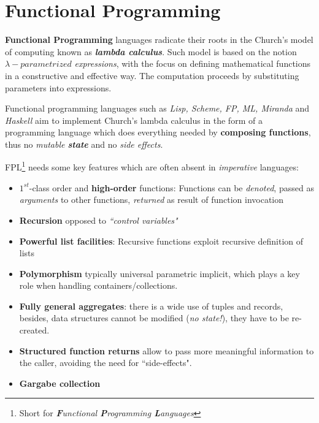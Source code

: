 \chapter{Functional Programming}
\textbf{Functional Programming} languages radicate their roots in the Church's model of computing known as \textbf{\textit{lambda calculus}}.
Such model is based on the notion $\lambda-\textit{parametrized}$ \textit{expressions},
with the focus on defining mathematical functions in a constructive and effective way.
The computation proceeds by substituting parameters into expressions.\nl

Functional programming languages such as \textit{Lisp, Scheme, FP, ML, Miranda} and \textit{Haskell} aim to implement Church's lambda calculus in the form of a programming language which does everything needed by \textbf{composing functions}, thus no \textit{mutable \textbf{state}} and no \textit{side effects}.

{FPL\footnote{Short for \textit{\textbf{F}unctional \textbf{P}rogramming \textbf{L}anguages}} needs some key features which are often absent in \textit{imperative} languages:\ns
\begin{itemize}
   \item $1^{st}$-class order and \textbf{high-order} functions:
   Functions can be \textit{denoted}, passed as \textit{arguments} to other functions, \textit{returned} as result of function invocation
   \item \textbf{Recursion} opposed to \textit{``control variables"}
   \item \textbf{Powerful list facilities}: Recursive functions exploit recursive definition of lists
   \item \textbf{Polymorphism} typically universal parametric
   implicit, 
   which plays a key role when handling containers/collections.
   \item \textbf{Fully general aggregates}:
   there is a wide use of tuples and records,
   besides,
   data structures cannot be modified (\textit{no state!}), they have to be re-created.
   \item \textbf{Structured function returns} allow to pass more meaningful information to the caller, avoiding the need for ``side-effects".
   \item \textbf{Gargabe collection}
\end{itemize}}

